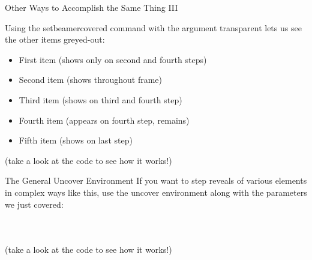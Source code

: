 \documentclass{beamer}
\begin{document}
\begin{frame}{Other Ways to Accomplish the Same Thing III}

	Using the \alert{setbeamercovered} command with the argument \alert{transparent} lets us see the other items greyed-out:
	

	\begin{itemize}
		\item<2,4> First item (shows only on second and fourth steps)
		\item<1-> Second item (shows throughout frame)
		\item<3-4> Third item (shows on third and fourth step)
		\item<4-> Fourth item (appears on fourth step, remains)
		\item<5-> Fifth item (shows on last step)
	\end{itemize} 
	
	
	
	\vfill
	
	{\scriptsize (take a look at the code to see how it works!)}

\end{frame}


\begin{frame}{The General Uncover Environment}
	If you want to step reveals of various elements in complex ways like this, use the \alert{uncover} environment along with the parameters we just covered:
	
	\vfill
	
	\begin{columns}[c]
	
	
		\bigskip
	
	
	
	\centering
	\begin{figure}
	\end{figure}
	
	\end{columns}
	
	\vfill
	
	{\scriptsize (take a look at the code to see how it works!)}
	
\end{frame}
\end{document}
